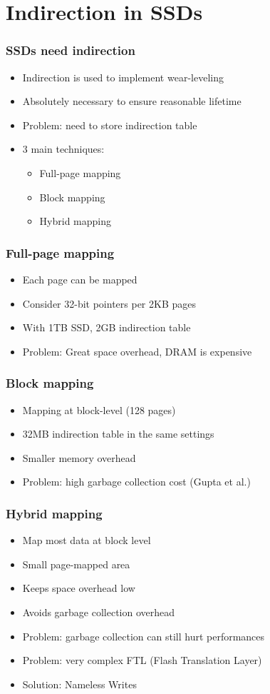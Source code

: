 \documentclass{beamer}
\begin{document}
\section{Indirection in SSDs}
\begin{frame}
  \frametitle{SSDs need indirection}
  \begin{itemize}
    \item Indirection is used to implement wear-leveling
    \item Absolutely necessary to ensure reasonable lifetime
    \item Problem: need to store indirection table
    \item 3 main techniques:
          \begin{itemize}
            \item Full-page mapping
            \item Block mapping
            \item Hybrid mapping
          \end{itemize}
  \end{itemize}
\end{frame}

\begin{frame}
  \frametitle{Full-page mapping}
  \begin{itemize}
    \item Each page can be mapped
    \item Consider 32-bit pointers per 2KB pages
    \item With 1TB SSD, 2GB indirection table
    \item Problem: Great space overhead, DRAM is expensive
  \end{itemize}
\end{frame}

\begin{frame}
  \frametitle{Block mapping}
  \begin{itemize}
    \item Mapping at block-level (128 pages)
    \item 32MB indirection table in the same settings
    \item Smaller memory overhead
    \item Problem: high garbage collection cost (Gupta et al.)
  \end{itemize}
\end{frame}

\begin{frame}
  \frametitle{Hybrid mapping}
  \begin{itemize}
    \item Map most data at block level
    \item Small page-mapped area
    \item Keeps space overhead low
    \item Avoids garbage collection overhead
    \item Problem: garbage collection can still hurt performances
    \item Problem: very complex FTL (Flash Translation Layer)
    \item Solution: Nameless Writes
  \end{itemize}
\end{frame}
\end{document}
